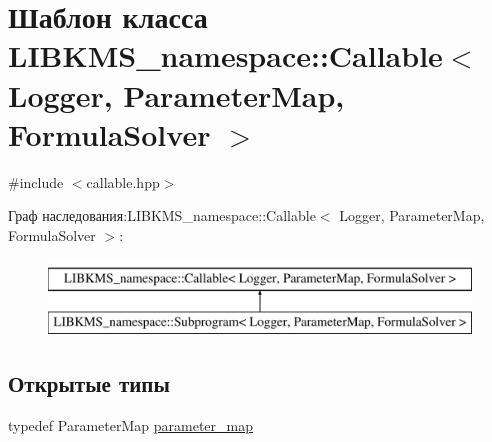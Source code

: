 \hypertarget{classLIBKMS__namespace_1_1Callable}{\section{Шаблон класса L\-I\-B\-K\-M\-S\-\_\-namespace\-:\-:Callable$<$ Logger, Parameter\-Map, Formula\-Solver $>$}
\label{classLIBKMS__namespace_1_1Callable}
}


{\ttfamily \#include $<$callable.\-hpp$>$}

Граф наследования\-:L\-I\-B\-K\-M\-S\-\_\-namespace\-:\-:Callable$<$ Logger, Parameter\-Map, Formula\-Solver $>$\-:\begin{figure}[H]
\begin{center}
\leavevmode
\includegraphics[height=2.000000cm]{classLIBKMS__namespace_1_1Callable}
\end{center}
\end{figure}
\subsection*{Открытые типы}
\begin{DoxyCompactItemize}
\item 
typedef Parameter\-Map \hyperlink{classLIBKMS__namespace_1_1Callable_ad58caabaa5ac247c9d385e6d5451916a}{parameter\-\_\-map}
\end{DoxyCompactItemize}
